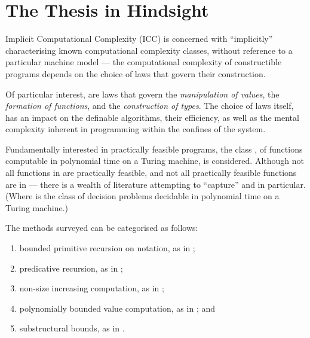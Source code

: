 \section{The Thesis in Hindsight}

Implicit Computational Complexity (ICC) is concerned with ``implicitly''
characterising known computational complexity classes, without reference to a
particular machine model --- the computational complexity of constructible
programs depends on the choice of laws that govern their construction.

Of particular interest, are laws that govern the \emph{manipulation of values},
the \emph{formation of functions}, and the \emph{construction of types}. The
choice of laws itself, has an impact on the definable algorithms, their
efficiency, as well as the mental complexity inherent in programming within the
confines of the system.
 
Fundamentally interested in practically feasible programs, the class \FPTIME{},
of functions computable in polynomial time on a Turing machine, is considered.
Although not all functions in \FPTIME{} are practically feasible, and not all
practically feasible functions are in \FPTIME{} --- there is a wealth of
literature attempting to ``capture'' \PTIME{} and \FPTIME{} in particular.
(Where \PTIME{} is the class of decision problems decidable in polynomial time
on a Turing machine.)

The methods surveyed can be categorised as follows:

\begin{enumerate}[label=\roman*.]

\item bounded primitive recursion on notation, as in \cite{cobham-1965};

\item predicative recursion, as in \cite{bellantoni-cook-1992, leivant-1995,
niggl-2005};

\item non-size increasing computation, as in \cite{jones-1999, hofmann-2003};

\item polynomially bounded value computation, as in
\cite{niggl-wunderlich-2006, jones-kristiansen-2009}; and

\item substructural bounds, as in \cite{girard-scedorov-scott-1992,
girard-1998}.

\end{enumerate}

